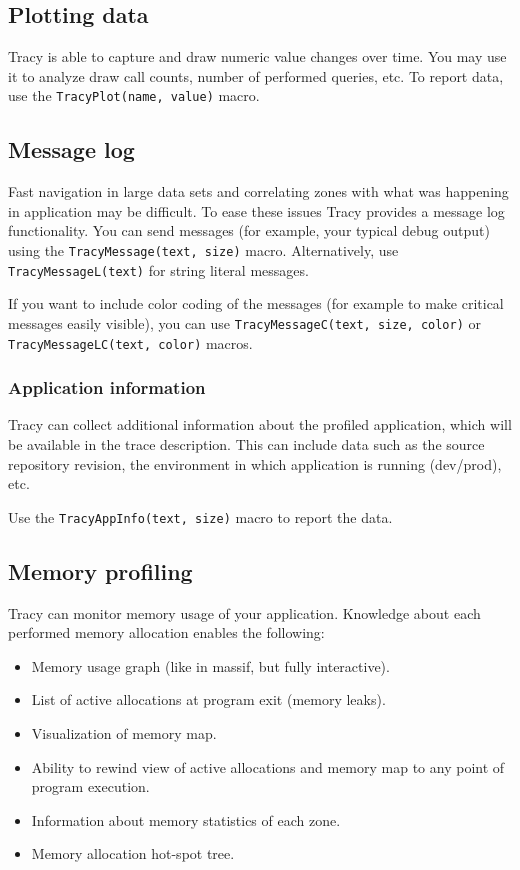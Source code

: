\documentclass[hidelinks,titlepage,a4paper]{article}
\begin{document}
\subsection{Plotting data}
\label{plottingdata}

Tracy is able to capture and draw numeric value changes over time. You may use it to analyze draw call counts, number of performed queries, etc. To report data, use the \texttt{TracyPlot(name, value)} macro.

\subsection{Message log}
\label{messagelog}

Fast navigation in large data sets and correlating zones with what was happening in application may be difficult. To ease these issues Tracy provides a message log functionality. You can send messages (for example, your typical debug output) using the \texttt{TracyMessage(text, size)} macro. Alternatively, use \texttt{TracyMessageL(text)} for string literal messages.

If you want to include color coding of the messages (for example to make critical messages easily visible), you can use \texttt{TracyMessageC(text, size, color)} or \texttt{TracyMessageLC(text, color)} macros.

\subsubsection{Application information}
\label{appinfo}

Tracy can collect additional information about the profiled application, which will be available in the trace description. This can include data such as the source repository revision, the environment in which application is running (dev/prod), etc.

Use the \texttt{TracyAppInfo(text, size)} macro to report the data.

\subsection{Memory profiling}
\label{memoryprofiling}

Tracy can monitor memory usage of your application. Knowledge about each performed memory allocation enables the following:

\begin{itemize}
\item Memory usage graph (like in massif, but fully interactive).
\item List of active allocations at program exit (memory leaks).
\item Visualization of memory map.
\item Ability to rewind view of active allocations and memory map to any point of program execution.
\item Information about memory statistics of each zone.
\item Memory allocation hot-spot tree.
\end{itemize}
\end{document}
